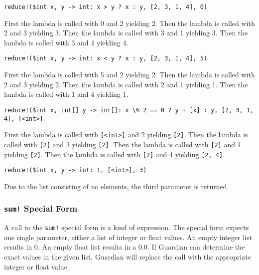 {{\begin{itemize}
{			\item[] \lstinline[language=MAIA, columns=fixed]@reduce!($int x, y -> int: x > y ? x : y, [2, 3, 1, 4], 0)@
			
				First the lambda is called with 0 and 2 yielding 2.
				Then the lambda is called with 2 and 3 yielding 3.
				Then the lambda is called with 3 and 1 yielding 3.
				Then the lambda is called with 3 and 4 yielding 4.
			
			\item[] \lstinline[language=MAIA, columns=fixed]@reduce!($int x, y -> int: x < y ? x : y, [2, 3, 1, 4], 5)@
			
				First the lambda is called with 5 and 2 yielding 2.
				Then the lambda is called with 2 and 3 yielding 2.
				Then the lambda is called with 2 and 1 yielding 1.
				Then the lambda is called with 1 and 4 yielding 1.
				
			\item[] \lstinline[language=MAIA, columns=fixed]@reduce!($int x, int[] y -> int[]: x \% 2 == 0 ? y + [x] : y, [2, 3, 1, 4], [<int>]@
			
				First the lambda is called with \lstinline[language=MAIA, columns=fixed]@[<int>]@ and 2 yielding \lstinline[language=MAIA, columns=fixed]@[2]@.
				Then the lambda is called with \lstinline[language=MAIA, columns=fixed]@[2]@ and 3 yielding \lstinline[language=MAIA, columns=fixed]@[2]@.
				Then the lambda is called with \lstinline[language=MAIA, columns=fixed]@[2]@ and 1 yielding \lstinline[language=MAIA, columns=fixed]@[2]@.
				Then the lambda is called with \lstinline[language=MAIA, columns=fixed]@[2]@ and 4 yielding \lstinline[language=MAIA, columns=fixed]@[2, 4]@.
				
			\item[] \lstinline[language=MAIA, columns=fixed]@reduce!($int x, y -> int: 1, [<int>], 3)@
			
				Due to the list consisting of no elements, the third parameter
				is returned.
		}
		\end{itemize}
	}
	
	\subsubsection{\lstinline[language=MAIA, columns=fixed]@sum!@ Special Form}
	{
		A call to the \lstinline[language=MAIA, columns=fixed]@sum!@ special form is a kind of expression.
		The special form expects one single parameter, either a list of integer
		or float values. An empty integer list results in 0. An empty float list
		results in a 0.0.
		If Guardian can determine the exact values in the given list, Guardian
		will replace the call with the appropriate integer or float value.
		
}}
